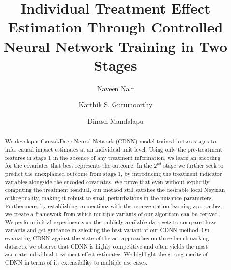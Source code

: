 \documentclass[sigconf]{acmart}
\newcommand{\eat}[1]{}
\theoremstyle{plain}
\numberwithin{equation}{section}
\begin{document}
\title[Individual Treatment Effect Estimation Through Controlled Neural Network Training]{Individual Treatment Effect Estimation Through Controlled Neural Network Training in Two Stages}
\author{Naveen Nair}

\author{Karthik S. Gurumoorthy}

\author{Dinesh Mandalapu}
\eat{
\author{Anonymous}
\affiliation{%
  \institution{Anonymous institution}
}
}
\begin{abstract}
We develop a Causal-Deep Neural Network (CDNN) model trained in two stages to infer causal impact estimates at an individual unit level. Using only the pre-treatment features in stage 1 in the absence of any treatment information, we learn an encoding for the covariates that best represents the outcome. In the $2^{nd}$ stage we further seek to predict the unexplained outcome from stage 1, by introducing the treatment indicator variables alongside the encoded covariates. We prove that even without explicitly computing the treatment residual, our method still satisfies the desirable local Neyman orthogonality, making it robust to small perturbations in the nuisance parameters. Furthermore, by establishing connections with the representation learning approaches, we create a framework from which multiple variants of our algorithm can be derived. We perform initial experiments on the publicly available data sets to compare these variants and get guidance in selecting the best variant of our CDNN method. On evaluating CDNN against the state-of-the-art approaches on three benchmarking datasets, we observe that CDNN is highly competitive and often yields the most accurate individual treatment effect estimates. We highlight the strong merits of CDNN in terms of its extensibility to multiple use cases.
\end{abstract}
\maketitle
\end{document}
